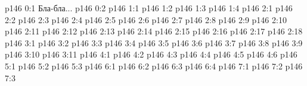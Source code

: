 \author{Промежуточные создания}
\vs p146 0:1  Бла-бла...
\vs p146 0:2 
\vs p146 1:1 
\vs p146 1:2 
\vs p146 1:3 \pc 
\vs p146 1:4 \pc 
{}
\vs p146 2:1 
\vs p146 2:2 
\vs p146 2:3 
\vs p146 2:4 
\vs p146 2:5 
\vs p146 2:6 
\vs p146 2:7 
\vs p146 2:8 
\vs p146 2:9 
\vs p146 2:10 
\vs p146 2:11 
\vs p146 2:12 
\vs p146 2:13 
\vs p146 2:14 
\vs p146 2:15 
\vs p146 2:16 
\vs p146 2:17 
\vs p146 2:18 \pc 
{}
\vs p146 3:1 
\vs p146 3:2 
\vs p146 3:3 \pc 
\vs p146 3:4 
\vs p146 3:5 
\vs p146 3:6 
\vs p146 3:7 
\vs p146 3:8 
\vs p146 3:9 \pc 
\vs p146 3:10 \pc 
\vs p146 3:11 
\vs p146 4:1 
\vs p146 4:2 
\vs p146 4:3 \pc 
\vs p146 4:4 
\vs p146 4:5 
\vs p146 4:6 \pc 
{}
\vs p146 5:1 
\vs p146 5:2 
\vs p146 5:3 
\vs p146 6:1 
\vs p146 6:2 \pc 
\vs p146 6:3 
\vs p146 6:4 
\vs p146 7:1 
\vs p146 7:2 
\vs p146 7:3 
\quizlink
